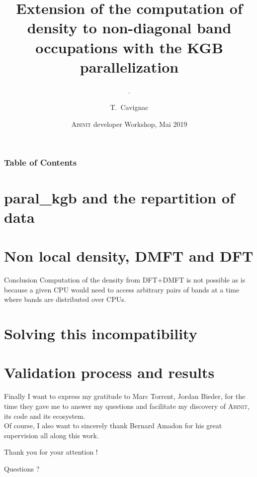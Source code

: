 \documentclass[22pt]{beamer}
\title{Extension of the computation of density to non-diagonal band occupations with the KGB parallelization}
\subtitle{.}
\author{T.~Cavignac}
\institute{
  CEA, DAM, DIF, 91297 Arpajon Cedex, France
  \and
  École Centrale de Lyon
}
\date{\textsc{Abinit} developer Workshop, Mai 2019}
\newcommand{\nologo}{\logo{}}
\begin{document}
  \frame{\titlepage}

  \nologo

  \begin{frame}
    \frametitle{Table of Contents}
    \tableofcontents
  \end{frame}

  \section{paral\_kgb and the repartition of data}
  

  \section{Non local density, DMFT and DFT}
  

  \begin{frame}
    \begin{block}{Conclusion}
      Computation of the density from DFT+DMFT is not possible as is because a given
      CPU would need to access arbitrary pairs of bands at a time where bands are
      distributed over CPUs.
    \end{block}
  \end{frame}

  \section{Solving this incompatibility}
  

  \section{Validation process and results}
  

  \begin{frame}
    Finally I want to express my gratitude to Marc Torrent, Jordan Bieder, for the time
    they gave me to answer my questions and facilitate my discovery of \textsc{Abinit}, its code
    and its ecosystem.\\
    Of course, I also want to sincerely thank Bernard Amadon for his great supervision all along this work.

  \end{frame}

  {\nologo
    \begin{frame}[focus]
      Thank you for your attention !
    \end{frame}

    \begin{frame}[focus]
      Questions ?
    \end{frame}
  }
\end{document}
